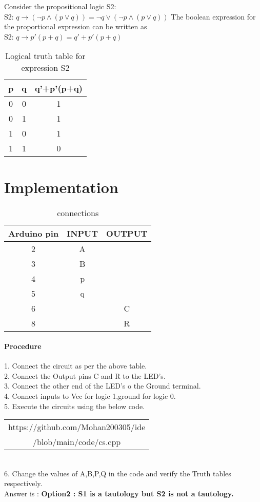 \documentclass[journal,12pt,twocolumn]{IEEEtran}
\begin{document}
Consider the propositional logic S2:\\
  S2: $q \longrightarrow (\neg{p}\land({p}\lor{q})) = \neg{q} \lor (\neg{p} \land ({p}\lor {q}))$
 The boolean expression for the proportional expression can be written as\\
 S2: $q \longrightarrow p'(p+q) = q'+p'(p+q)$
\begin{table}[h]
	\centering
	\caption{Logical truth table for expression S2}
	\begin{tabular}{|c|c|c|}
		\hline
		p & q & q'+p'(p+q)\\
		\hline
		0 & 0 & 1\\
		\hline
		0 & 1 & 1\\
		\hline
		1 & 0 & 1\\
		\hline
		1 & 1 & 0\\
		\hline
	\end{tabular}
\end{table}



\section{Implementation}

\begin{table}[h]
  \centering
  \caption{connections}
  \begin{tabular}{|c|c|c|}
\hline
Arduino pin & INPUT & OUTPUT\\
\hline
2 & A &\\
\hline
3 & B &\\
\hline
4 & p &\\
\hline
5 & q &\\
\hline
6 & & C\\
\hline
8 & & R\\
\hline
  \end{tabular}
\end{table}

\paragraph{Procedure}

   1. Connect the circuit as per the above table.\\
   2. Connect the Output pins C and R to the LED's.\\
   3. Connect the other end of the LED's o the Ground terminal.\\
   4. Connect inputs to Vcc for logic 1,ground for logic 0.\\
   5. Execute the circuits using the below code.\\
   \begin{table}[h]
	   \centering
	   \begin{tabular}{|c|}
	   \hline
	   https://github.com/Mohan200305/ide\\
	   /blob/main/code/cs.cpp\\
	   \hline
	   \end{tabular}
   \end{table}\\
   6. Change the values of A,B,P,Q in the code and verify the Truth tables respectively.\\

   Answer is :
   \textbf{Option2 : S1 is a tautology but S2 is not a tautology.}

\end{document}
